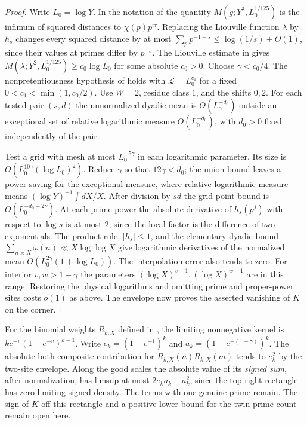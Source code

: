 \documentclass[11pt]{article}
\begin{document}
\begin{proof}
Write $L_0=\log Y$. In the notation of \cite[(1.18)]{TT} the
quantity $M(g;Y^2,L_0^{1/125})$ is the infimum of
squared distances to $\chi(p)p^{i\tau}$. Replacing the Liouville
function $\lambda$ by $h_s$ changes every squared distance by
at most $\sum_p p^{-1-s}\le\log(1/s)+O(1)$, since their values
at primes differ by $p^{-s}$. The Liouville estimate in
\cite[Remarks 3.2]{TT} gives $M(\lambda;Y^2,L_0^{1/125})\ge
c_0\log L_0$ for some absolute $c_0>0$. Choose
$\gamma<c_0/4$. The nonpretentiousness hypothesis of
\cite[Theorem 3.1(ii)]{TT} holds with $\mathcal L=L_0^{c_1}$
for a fixed $0<c_1<\min(1,c_0/2)$. Use $W=2$, residue class $1$,
and the shifts $0,2$. For each tested pair $(s,d)$ the unnormalized
dyadic mean is $O(L_0^{-d_0})$ outside an exceptional set of
relative logarithmic measure $O(L_0^{-d_0})$, with $d_0>0$ fixed
independently of the pair.

Test a grid with mesh at most $L_0^{-5\gamma}$ in each logarithmic
parameter. Its size is $O(L_0^{10\gamma}(\log L_0)^2)$. Reduce
$\gamma$ so that $12\gamma<d_0$; the union bound leaves a power
saving for the exceptional measure, where relative logarithmic
measure means $(\log Y)^{-1}\int dX/X$. After division by $sd$
the grid-point bound is $O(L_0^{-d_0+2\gamma})$.
At each prime power the absolute derivative of $h_s(p^j)$
with respect to $\log s$ is at most $2$, since the local factor is
the difference of two exponentials. The product rule, $|h_s|\le1$,
and the elementary dyadic bound $\sum_{n\asymp X}\omega(n)\ll
X\log\log X$ give logarithmic derivatives of the normalized mean
$O(L_0^{2\gamma}(1+\log L_0))$. The interpolation error also tends
to zero. For interior $v,w>1-\gamma$ the parameters
$(\log X)^{v-1},(\log X)^{w-1}$ are in this range. Restoring the
physical logarithms and omitting prime and proper-power sites
costs $o(1)$ as above. The envelope now proves the asserted
vanishing of $K$ on the corner.
\end{proof}

For the binomial weights $R_{k,X}$ defined in \cite{OneSite}, the
limiting nonnegative kernel is $k e^{-v}(1-e^{-v})^{k-1}$. Write
$e_k=(1-e^{-1})^k$ and $a_k=(1-e^{-(1-\gamma)})^k$. The absolute
both-composite contribution for $R_{k,X}(n)R_{k,X}(m)$ tends
to $e_k^2$ by the two-site envelope. Along the good scales the
absolute value of its \emph{signed sum}, after normalization, has
limsup at most $2e_ka_k-a_k^2$, since the top-right rectangle has
zero limiting signed density. The terms with one genuine prime
remain. The sign of $K$ off this rectangle and a positive lower
bound for the twin-prime count remain open here.
\end{document}
